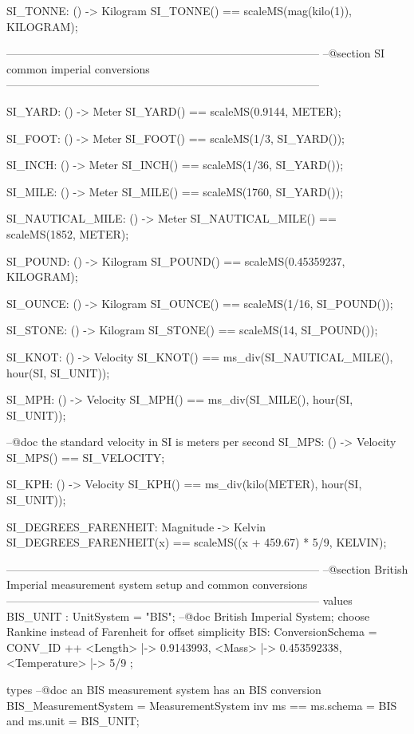 \documentclass[a4paper]{article}
\begin{document}
\begin{vdm_al}
 SI_TONNE: () -> Kilogram
 SI_TONNE() == scaleMS(mag(kilo(1)), KILOGRAM);
        
------------------------------------------------------------------------------------
--@section SI common imperial conversions
------------------------------------------------------------------------------------

 SI_YARD: () -> Meter
 SI_YARD() == scaleMS(0.9144, METER);
 
 SI_FOOT: () -> Meter
 SI_FOOT() == scaleMS(1/3, SI_YARD());
 
 SI_INCH: () -> Meter
 SI_INCH() == scaleMS(1/36, SI_YARD());
 
 SI_MILE: () -> Meter
 SI_MILE() == scaleMS(1760, SI_YARD());
 
 SI_NAUTICAL_MILE: () -> Meter
 SI_NAUTICAL_MILE() == scaleMS(1852, METER);
 
 SI_POUND: () -> Kilogram
 SI_POUND() == scaleMS(0.45359237, KILOGRAM);
 
 SI_OUNCE: () -> Kilogram
 SI_OUNCE() == scaleMS(1/16, SI_POUND());
 
 SI_STONE: () -> Kilogram
 SI_STONE() == scaleMS(14, SI_POUND());

 SI_KNOT: () -> Velocity
 SI_KNOT() == ms_div(SI_NAUTICAL_MILE(), hour(SI, SI_UNIT));
 
 SI_MPH: () -> Velocity
 SI_MPH() == ms_div(SI_MILE(), hour(SI, SI_UNIT));
 
 --@doc the standard velocity in SI is meters per second 
 SI_MPS: () -> Velocity
 SI_MPS() == SI_VELOCITY;

 SI_KPH: () -> Velocity
 SI_KPH() == ms_div(kilo(METER), hour(SI, SI_UNIT));
 
 SI_DEGREES_FARENHEIT: Magnitude -> Kelvin
 SI_DEGREES_FARENHEIT(x) == scaleMS((x + 459.67) * 5/9, KELVIN);
      
------------------------------------------------------------------------------------
--@section British Imperial measurement system setup and common conversions
------------------------------------------------------------------------------------
values
 BIS_UNIT   : UnitSystem = "BIS";
 --@doc British Imperial System; choose Rankine instead of Farenheit for offset simplicity
 BIS: ConversionSchema = CONV_ID ++ 
  { <Length> |-> 0.9143993, <Mass> |-> 0.453592338, <Temperature> |-> 5/9  };

types
 --@doc an BIS measurement system has an BIS conversion
 BIS_MeasurementSystem = MeasurementSystem
 inv ms == ms.schema = BIS and ms.unit = BIS_UNIT;
 

\end{vdm_al}
\end{document}
